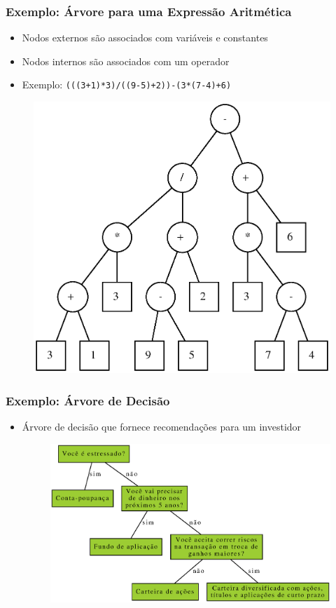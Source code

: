 \documentclass[aspectratio=169]{beamer}
\begin{document}
\begin{frame}\frametitle{Exemplo: Árvore para uma Expressão Aritmética}
\begin{itemize}
	\item Nodos externos são associados com variáveis e constantes
	\item Nodos internos são associados com um operador
	\item Exemplo: \texttt{(((3+1)*3)/((9-5)+2))-(3*(7-4)+6)}
\end{itemize}
\begin{figure}[h]
	\centering
	\includegraphics[height=0.55\paperheight]{imagens/arvore_binaria09-expressao.eps}
\end{figure}
\end{frame}

\begin{frame}\frametitle{Exemplo: Árvore de Decisão}
\begin{itemize}
	\item Árvore de decisão que fornece recomendações para um investidor
\begin{figure}[h]
	\centering
	\includegraphics[height=0.65\paperheight]{imagens/arvore_de_decisao3.eps}
\end{figure}
\end{itemize}
\end{frame}
\end{document}

